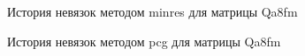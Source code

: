 \begin{figure}
    \renewcommand{\figurename}{Рисунок}
    \caption{История невязок методом minres для матрицы Qa8fm}
    \label{fig:image}
\end{figure}

\begin{figure}
    \renewcommand{\figurename}{Рисунок}
    \caption{История невязок методом pcg для матрицы Qa8fm}
    \label{fig:image}
\end{figure}

